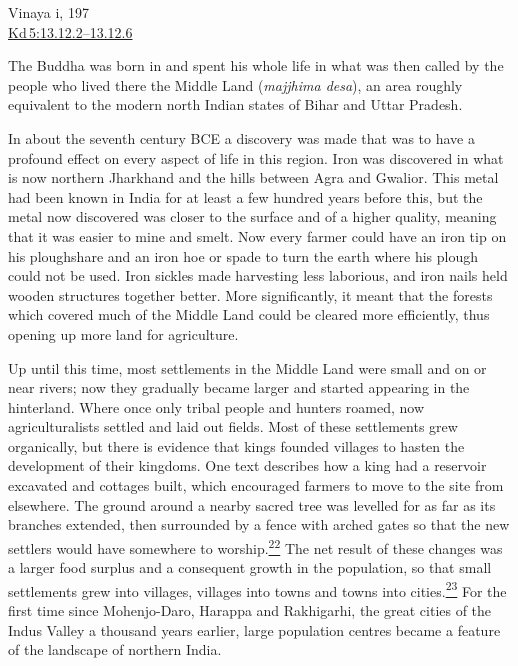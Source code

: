 Vinaya i, 197\\
\href{https://suttacentral.net/pli-tv-kd5/en/brahmali\#13.12.2}{Kd\,5:13.12.2--13.12.6}

The Buddha was born in and spent his whole life in what was then called
by the people who lived there the Middle Land (\emph{majjhima desa}), an
area roughly equivalent to the modern north Indian states of Bihar and
Uttar Pradesh.

In about the seventh century BCE a discovery was made that was to have a
profound effect on every aspect of life in this region. Iron was
discovered in what is now northern Jharkhand and the hills between Agra
and Gwalior. This metal had been known in India for at least a few
hundred years before this, but the metal now discovered was closer to
the surface and of a higher quality, meaning that it was easier to mine
and smelt. Now every farmer could have an iron tip on his ploughshare
and an iron hoe or spade to turn the earth where his plough could not be
used. Iron sickles made harvesting less laborious, and iron nails held
wooden structures together better. More significantly, it meant that the
forests which covered much of the Middle Land could be cleared more
efficiently, thus opening up more land for agriculture.

Up until this time, most settlements in the Middle Land were small and
on or near rivers; now they gradually became larger and started
appearing in the hinterland. Where once only tribal people and hunters
roamed, now agriculturalists settled and laid out fields. Most of these
settlements grew organically, but there is evidence that kings founded
villages to hasten the development of their kingdoms. One text describes
how a king had a reservoir excavated and cottages built, which
encouraged farmers to move to the site from elsewhere. The ground around
a nearby sacred tree was levelled for as far as its branches extended,
then surrounded by a fence with arched gates so that the new settlers
would have somewhere to
worship.\label{footprints_split_006.html_fnref22}\hyperref[footprints_split_024.htmlux5cux23fn22]{\textsuperscript{22}}
The net result of these changes was a larger food surplus and a
consequent growth in the population, so that small settlements grew into
villages, villages into towns and towns into
cities.\label{footprints_split_006.html_fnref23}\hyperref[footprints_split_024.htmlux5cux23fn23]{\textsuperscript{23}}
For the first time since Mohenjo-Daro, Harappa and Rakhigarhi, the great
cities of the Indus Valley a thousand years earlier, large population
centres became a feature of the landscape of northern India.

